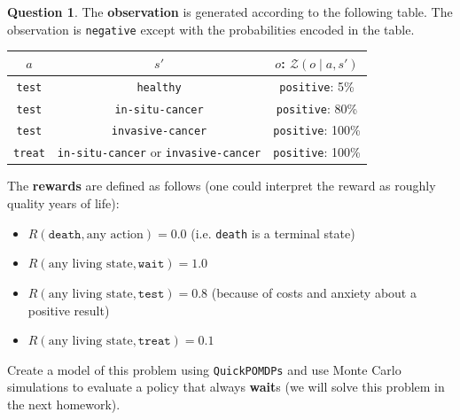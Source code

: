 \documentclass{article}
\theoremstyle{definition}
\newtheorem{question}[thm]{Question}
\newcommand{\ttt}[1]{\texttt{#1}}
\begin{document}
\begin{question}
The \textbf{observation} is generated according to the following table. The observation is \ttt{negative} except with the probabilities encoded in the table.
\begin{center}
    \begin{tabular}{ccc}
    \toprule
    $a$ & $s'$ & $o$: $\mathcal{Z}(o \mid a, s')$ \\
    \midrule
    \texttt{test} & \texttt{healthy} & \texttt{positive}: 5\% \\
    \texttt{test} & \texttt{in-situ-cancer} & \texttt{positive}: 80\% \\
    \texttt{test} & \texttt{invasive-cancer} & \texttt{positive}: 100\% \\
    \texttt{treat} & \ttt{in-situ-cancer} or \texttt{invasive-cancer} & \texttt{positive}: 100\% \\
    \bottomrule
    \end{tabular}
\end{center}

The \textbf{rewards} are defined as follows (one could interpret the reward as roughly quality years of life):
\begin{itemize}[noitemsep]
    \item $R(\texttt{death}, \text{any action}) = 0.0$ (i.e. \texttt{death} is a terminal state)
    \item $R(\text{any living state}, \texttt{wait}) = 1.0$
    \item $R(\text{any living state}, \texttt{test}) = 0.8$ (because of costs and anxiety about a positive result)
    \item $R(\text{any living state}, \texttt{treat}) = 0.1$
\end{itemize}

Create a model of this problem using \texttt{QuickPOMDPs} and use Monte Carlo simulations to evaluate a policy that always \textbf{wait}s (we will solve this problem in the next homework).

\end{question}

\end{document}
